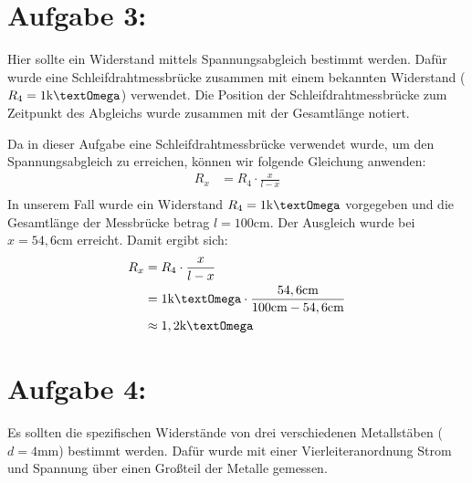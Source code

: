 \documentclass[]{article}
\newcommand{\unit}[1]{\text{#1}}
\begin{document}
\newpage
\section*{Aufgabe 3:}
	Hier sollte ein Widerstand mittels Spannungsabgleich bestimmt werden. Dafür wurde eine Schleifdrahtmessbrücke zusammen mit einem bekannten Widerstand ($R_4 = 1\unit{k\textOmega}$) verwendet. Die Position der Schleifdrahtmessbrücke zum Zeitpunkt des Abgleichs wurde zusammen mit der Gesamtlänge notiert.

	Da in dieser Aufgabe eine Schleifdrahtmessbrücke verwendet wurde, um den Spannungsabgleich zu erreichen, können wir folgende Gleichung anwenden:
	\begin{align*}
		&&R_x &= R_4 \cdot \frac{x}{l-x} &&\\
	\end{align*}
	In unserem Fall wurde ein Widerstand $R_4 = 1\unit{k\textOmega}$ vorgegeben und die Gesamtlänge der Messbrücke betrag $l = 100\unit{cm}$. Der Ausgleich wurde bei $x=54,6\unit{cm}$ erreicht. Damit ergibt sich:
	\begin{align*}
		&&R_x &= R_4 \cdot \frac{x}{l-x} &&\\
		&& &= 1\unit{k\textOmega} \cdot \frac{54,6\unit{cm}}{100\unit{cm}-54,6\unit{cm}} &&\\
		&& &\approx 1,2\unit{k\textOmega}&&\\
	\end{align*}

\newpage
\section*{Aufgabe 4:}
	Es sollten die spezifischen Widerstände von drei verschiedenen Metallstäben ($d = 4\unit{mm}$) bestimmt werden. Dafür wurde mit einer Vierleiteranordnung Strom und Spannung über einen Großteil der Metalle gemessen.
\end{document}

